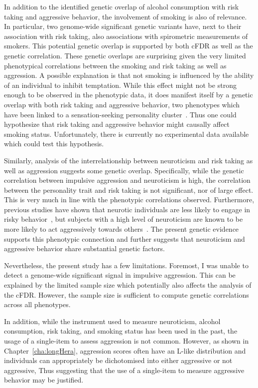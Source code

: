 In addition to the identified genetic overlap of alcohol consumption with risk taking and aggressive behavior, the involvement of smoking is also of relevance.
In particular, two genome-wide significant genetic variants have, next to their association with risk taking, also associations with spirometric measurements of smokers.
This potential genetic overlap is supported by both cFDR as well as the genetic correlation.
These genetic overlaps are surprising given the very limited phenotypical correlations between the smoking and risk taking as well as aggression.
A possible explanation is that not smoking is influenced by the ability of an individual to  inhibit temptation.
While this effect might not be strong enough to be observed in the phenotypic data, it does manifest itself by a genetic overlap with both risk taking and aggressive behavior,
two phenotypes which have been linked to a sensation-seeking personality cluster~\cite{Zuckerman2000}.
Thus one could hypothesize that risk taking and aggressive behavior might causally affect smoking status.
Unfortunately, there is currently no experimental data available which could test this hypothesis.

Similarly, analysis of the interrelationship between neuroticism and risk taking as well as aggression suggests some genetic overlap.
Specifically, while the genetic correlation between impulsive aggression and neuroticism is high, the correlation between the personality trait and risk taking is not significant, nor of large effect.
This is very much in line with the phenotypic correlations observed.
Furthermore, previous studies have shown that neurotic individuals are less likely to engage in risky behavior~\cite{Lauriola2001,InstituteofMedicine2011,Paulus2003}, but subjects with a high level of neuroticism are known to be more likely to act aggressively towards others~\cite{Meesters2007}.
The present genetic evidence supports this phenotypic connection and further suggests that neuroticism and aggressive behavior share substantial genetic factors.

Nevertheless, the  present study has a few limitations.
Foremost, I was unable to detect a genome-wide significant signal in impulsive aggression.
This can be explained by the limited sample size which potentially also affects the analysis of the cFDR\@.
However, the sample size is sufficient to compute genetic correlations across all  phenotypes.

In addition, while the instrument used to measure  neuroticism, alcohol consumption, risk taking, and smoking status has been used in the past, the usage of a single-item to assess aggression is not common.
However, as shown in Chapter~\ref{cha:longHera},  aggression scores often have an L-like distribution and individuals can appropriately be dichotomised into either aggressive or not aggressive,
Thus suggesting that the use of a single-item to measure aggressive behavior may be justified.

